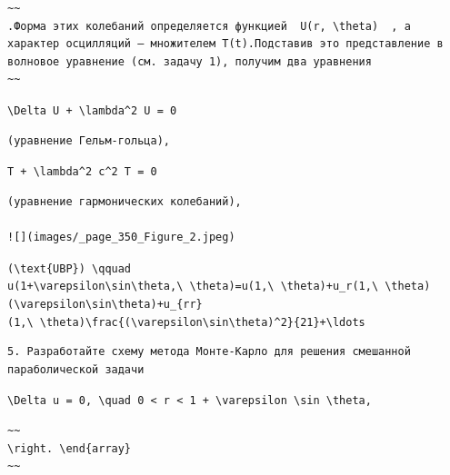 \documentclass[
  ukrainian,
]{article}
\begin{document}
\begin{verbatim}
~~
.Форма этих колебаний определяется функцией  U(r, \theta)  , а характер осцилляций — множителем T(t).Подставив это представление в волновое уравнение (см. задачу 1), получим два уравнения
~~
\end{verbatim}

\texttt{\textbackslash{}Delta\ U\ +\ \textbackslash{}lambda\^{}2\ U\ =\ 0}

\begin{verbatim}
(уравнение Гельм-гольца),
\end{verbatim}

\texttt{T\textquotesingle{}\textquotesingle{}\ +\ \textbackslash{}lambda\^{}2\ c\^{}2\ T\ =\ 0}

\begin{verbatim}
(уравнение гармонических колебаний),

![](images/_page_350_Figure_2.jpeg)
\end{verbatim}

\texttt{(\textbackslash{}text\{UBP\})\ \textbackslash{}qquad}
\texttt{u(1+\textbackslash{}varepsilon\textbackslash{}sin\textbackslash{}theta,\textbackslash{}\ \textbackslash{}theta)=u(1,\textbackslash{}\ \textbackslash{}theta)+u\_r(1,\textbackslash{}\ \textbackslash{}theta)(\textbackslash{}varepsilon\textbackslash{}sin\textbackslash{}theta)+u\_\{rr\}(1,\textbackslash{}\ \textbackslash{}theta)\textbackslash{}frac\{(\textbackslash{}varepsilon\textbackslash{}sin\textbackslash{}theta)\^{}2\}\{21\}+\textbackslash{}ldots}

\begin{verbatim}
5. Разработайте схему метода Монте-Карло для решения смешанной параболической задачи
\end{verbatim}

\texttt{\textbackslash{}Delta\ u\ =\ 0,\ \textbackslash{}quad\ 0\ \textless{}\ r\ \textless{}\ 1\ +\ \textbackslash{}varepsilon\ \textbackslash{}sin\ \textbackslash{}theta,}

\begin{verbatim}
~~
\right. \end{array}
~~
\end{verbatim}
\end{document}
